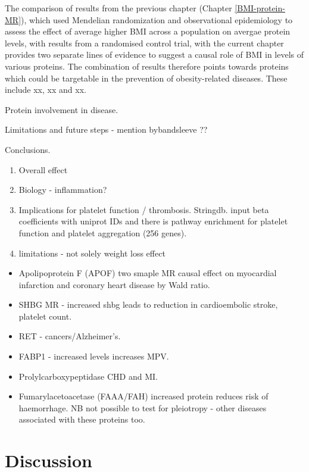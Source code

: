 \documentclass[11pt,twoside]{bristolthesis}
\providecommand{\tightlist}{%
  \setlength{\itemsep}{0pt}\setlength{\parskip}{0pt}}
\begin{document}
The comparison of results from the previous chapter (Chapter \ref{BMI-protein-MR}), which used Mendelian randomization and observational epidemiology to assess the effect of average higher BMI across a population on avergae protein levels, with results from a randomised control trial, with the current chapter provides two separate lines of evidence to suggest a causal role of BMI in levels of various proteins. The combination of results therefore points towards proteins which could be targetable in the prevention of obesity-related diseases. These include xx, xx and xx.

Protein involvement in disease.

Limitations and future steps - mention bybandsleeve ??

Conclusions.
\begin{enumerate}
\def\labelenumi{\arabic{enumi}.}
\tightlist
\item
  Overall effect
\item
  Biology - inflammation?
\item
  Implications for platelet function / thrombosis. Stringdb. input beta coefficients with uniprot IDs and there is pathway enrichment for platelet function and platelet aggregation (256 genes).
\item
  limitations - not solely weight loss effect
\end{enumerate}
\begin{itemize}
\tightlist
\item
  Apolipoprotein F (APOF) two smaple MR causal effect on myocardial infarction and coronary heart disease by Wald ratio.
\item
  SHBG MR - increased shbg leads to reduction in cardioembolic stroke, platelet count.
\item
  RET - cancers/Alzheimer's.
\item
  FABP1 - increased levels increases MPV.
\item
  Prolylcarboxypeptidase CHD and MI.
\item
  Fumarylacetoacetase (FAAA/FAH) increased protein reduces risk of haemorrhage.
  NB not possible to test for pleiotropy - other diseases associated with these proteins too.
\end{itemize}
\hypertarget{discussion-5}{%
\chapter{Discussion}\label{discussion-5}}
\end{document}
